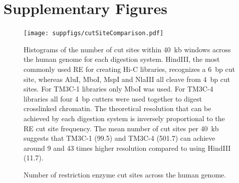 \section{Supplementary Figures}


\begin{figure}[ht!]
\begin{center}
\texttt{[image: suppfigs/cutSiteComparison.pdf]}
\end{center}
\caption{Number of restriction enzyme cut sites across the human genome.}
{Histograms of the number of cut sites within 40~kb windows across the human
    genome for each digestion system. HindIII, the most commonly used RE
    for creating Hi-C libraries, recognizes a 6~bp cut site, whereas AluI,
    MboI, MspI and NlaIII all cleave from 4~bp cut sites. For TM3C-1 libraries
    only MboI was used. For TM3C-4 libraries all four 4~bp cutters were used
    together to digest crosslinked chromatin. The theoretical resolution that can
    be achieved by each digestion system is inversely proportional to the
    RE cut site frequency. The mean number of cut sites per 40~kb suggests that
    TM3C-1 (99.5) and TM3C-4 (501.7) can achieve around 9 and 43 times
    higher resolution compared to using HindIII (11.7).
}
\label{suppfig:cutSiteComparison}
\end{figure}
\clearpage

